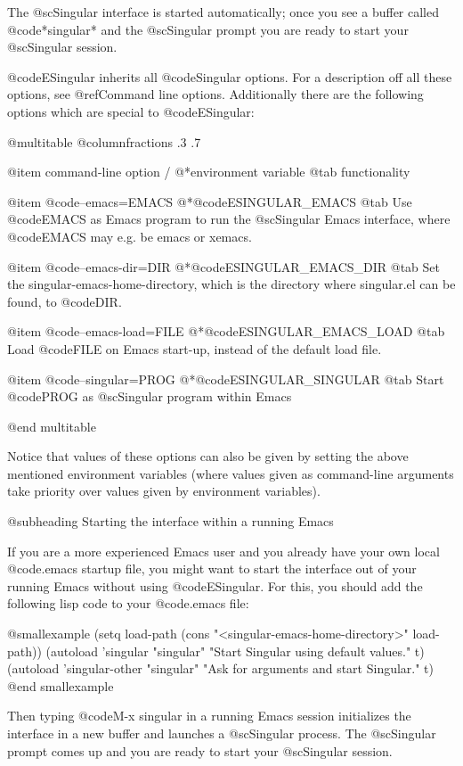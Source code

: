 The @sc{Singular} interface is started automatically; once you see a
buffer called @code{*singular*} and the @sc{Singular} prompt you are
ready to start your @sc{Singular} session.

@code{ESingular} inherits all @code{Singular} options. For a description
off all these options, see @ref{Command line options}. Additionally
there are the following options which are special to @code{ESingular}:

@multitable @columnfractions .3 .7

@item command-line option /
@*environment variable
@tab functionality

@item @code{--emacs=EMACS}
@*@code{ESINGULAR_EMACS}
@tab Use @code{EMACS} as Emacs program to run the @sc{Singular} Emacs
interface, where @code{EMACS} may e.g. be emacs or xemacs.

@item @code{--emacs-dir=DIR}
@*@code{ESINGULAR_EMACS_DIR}
@tab Set the singular-emacs-home-directory, which is the directory where
singular.el can be found,  to @code{DIR}.

@item @code{--emacs-load=FILE}
@*@code{ESINGULAR_EMACS_LOAD}
@tab Load @code{FILE} on Emacs start-up, instead of the default load file.

@item @code{--singular=PROG}
@*@code{ESINGULAR_SINGULAR}
@tab Start @code{PROG} as @sc{Singular} program within Emacs

@end multitable

Notice that values of these options can also be given by setting the
above mentioned environment variables (where values  given as
command-line arguments take priority over values given by environment
variables).

@subheading Starting the interface within a running Emacs

If you are a more experienced Emacs user and you already have your own
local @code{.emacs} startup file, you might want to start the interface
out of your running Emacs without using @code{ESingular}. For this, you
should add the following lisp code to your @code{.emacs} file:

@smallexample
(setq load-path (cons "<singular-emacs-home-directory>" load-path))
(autoload 'singular "singular"
  "Start Singular using default values." t)
(autoload 'singular-other "singular"
  "Ask for arguments and start Singular." t)
@end smallexample

Then typing @code{M-x singular} in a running Emacs session initializes
the interface in a new buffer and launches a @sc{Singular} process. The
@sc{Singular} prompt comes up and you are ready to start your
@sc{Singular} session.

